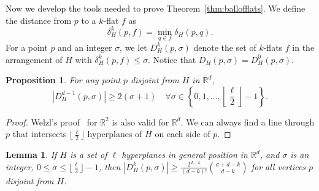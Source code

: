 \documentclass [letterpaper] {article}
\newtheorem{lemma}{Lemma}%
\newtheorem{proposition}{Proposition}[section]
\begin{document}
Now we develop the tools needed to prove Theorem~\ref{thm:ballofflats}. We define the distance from $p$ to a $k$-flat $f$ as
\begin{equation}
  \label{eq:distflat}
  \delta_{H}^{k}(p,f) = \min_{q \in f}\delta_{H}(p,q). \nonumber
\end{equation}
For a point $p$ and an integer $\sigma$, we let $D_{H}^{k}(p,\sigma)$ denote the set of $k$-flats $f$ in the arrangement of $H$ with $\delta_{H}^{k}(p,f) \leq \sigma$. Notice that $D_{H}(p,\sigma) = D_{H}^{0}(p,\sigma)$.

\begin{proposition}
\label{prop:planes}
  For any point $p$ disjoint from $H$ in $\mathbb{R}^{d}$, 
  \[ |D_{H}^{d-1}(p,\sigma)| \geq 2(\sigma+1) \quad \forall \sigma \in \left\{0, 1, \ldots, \left\lfloor \frac{\ell}{2} \right\rfloor - 1\right\}. \]
\end{proposition}

\begin{proof}
  Welzl's proof~\cite{welzl92} for $\mathbb{R}^{2}$ is also valid for $\mathbb{R}^{d}$. We can always find a line through $p$ that intersects $\lfloor \frac{\ell}{2} \rfloor$ hyperplanes of $H$ on each side of $p$. %
\end{proof}

\begin{lemma}
\label{lem:ballofflats}
  If $H$ is a set of $\ell$ hyperplanes in general position in $\mathbb{R}^{d}$, and $\sigma$ is an integer, $0 \leq \sigma \leq \lfloor \frac{\ell}{2}\rfloor - 1$, then $|D_{H}^{k}(p,\sigma)| \geq \frac{2^{d-k}}{(d-k)!}\binom{\sigma + d-k}{d-k}$ for all vertices $p$ disjoint from $H$.
\end{lemma}
\end{document}
